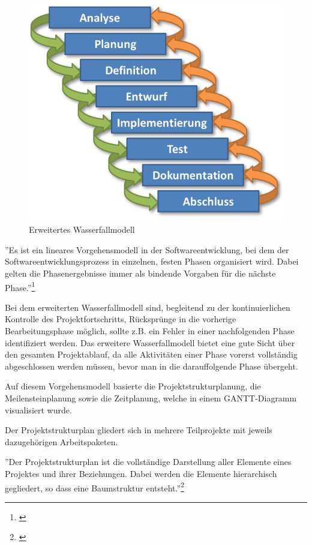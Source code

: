 \begin{figure}[h]
	\includegraphics[width=0.8\columnwidth]{img/projektablaufplan-erweitertes-wasserfallmodell}
	\caption[Erweitertes Wasserfallmodell]{Erweitertes Wasserfallmodell\footnotemark}
\end{figure}

''Es ist ein lineares Vorgehensmodell in der Softwareentwicklung, bei dem der Softwareentwicklungsprozess in einzelnen, festen Phasen organisiert wird. Dabei gelten die Phasenergebnisse immer als bindende Vorgaben für die nächste Phase.''\footnote{\cite[][]{itemis2015}}

Bei dem erweiterten Wasserfallmodell sind, begleitend zu der kontinuierlichen Kontrolle des Projektfortschritts, Rücksprünge in die vorherige Bearbeitungsphase möglich, sollte z.B. ein Fehler in einer nachfolgenden Phase identifiziert werden. Das erweitere Wasserfallmodell bietet eine gute Sicht über den gesamten Projektablauf, da alle Aktivitäten einer Phase vorerst vollständig abgeschlossen werden müssen, bevor man in die darauffolgende Phase übergeht.

Auf diesem Vorgehensmodell basierte die Projektstrukturplanung, die Meilensteinplanung sowie die Zeitplanung, welche in einem GANTT-Diagramm visualisiert wurde.

Der Projektstrukturplan gliedert sich in mehrere Teilprojekte mit jeweils dazugehörigen Arbeitspaketen.

''Der Projektstrukturplan ist die vollständige Darstellung aller Elemente eines Projektes und ihrer Beziehungen. Dabei werden die Elemente hierarchisch gegliedert, so dass eine Baumstruktur entsteht.''\footnote{\cite[][]{andreawindolph}}

